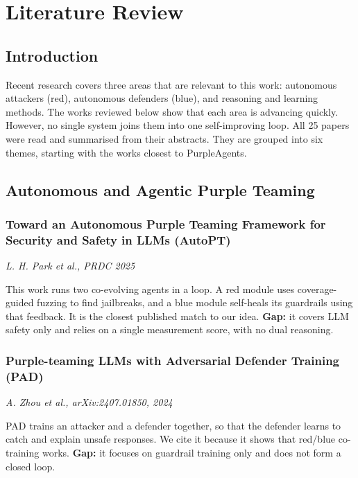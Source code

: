 \chapter{Literature Review}
\label{ch:lit}

\newcommand{\paperinfo}[1]{\noindent\textit{#1}\par\smallskip}

\section{Introduction}

Recent research covers three areas that are relevant to this work: autonomous
attackers (red), autonomous defenders (blue), and reasoning and learning methods.
The works reviewed below show that each area is advancing quickly. However, no
single system joins them into one self-improving loop. All 25 papers were read
and summarised from their abstracts. They are grouped into six themes, starting
with the works closest to PurpleAgents.

\section{Autonomous and Agentic Purple Teaming}

\subsection{Toward an Autonomous Purple Teaming Framework for Security and Safety in LLMs (AutoPT)}
\paperinfo{L. H. Park et al., PRDC 2025~\cite{park2025autopt}}
This work runs two co-evolving agents in a loop. A red module uses
coverage-guided fuzzing to find jailbreaks, and a blue module self-heals its
guardrails using that feedback. It is the closest published match to our idea.
\textbf{Gap:} it covers LLM safety only and relies on a single measurement score,
with no dual reasoning.

\subsection{Purple-teaming LLMs with Adversarial Defender Training (PAD)}
\paperinfo{A. Zhou et al., arXiv:2407.01850, 2024~\cite{zhou2024pad}}
PAD trains an attacker and a defender together, so that the defender learns to
catch and explain unsafe responses. We cite it because it shows that red/blue
co-training works. \textbf{Gap:} it focuses on guardrail training only and does
not form a closed loop.

